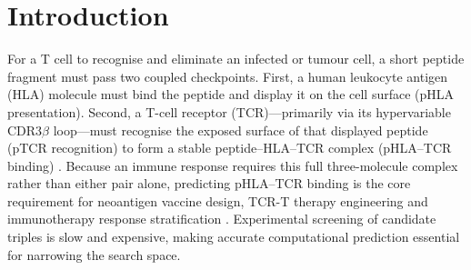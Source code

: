 \documentclass[webpdf,modern,large,namedate]{oup-authoring-template}
\theoremstyle{thmstyleone}
\theoremstyle{thmstyletwo}
\theoremstyle{thmstylethree}
\newcommand{\PH}{pHLA}
\newcommand{\PT}{pTCR}
\newcommand{\PHT}{pHLA--TCR}
\begin{document}
\section{Introduction}\label{sec:intro}

For a T cell to recognise and eliminate an infected or tumour cell, a short
peptide fragment must pass two coupled checkpoints. First, a human leukocyte
antigen (HLA) molecule must bind the peptide and display it on the cell surface
(\PH{} presentation). Second, a T-cell receptor (TCR)---primarily via its
hypervariable CDR3$\beta$ loop---must recognise the exposed surface of that
displayed peptide (\PT{} recognition) to form a stable peptide--HLA--TCR
complex (\PHT{} binding) \citep{rudolph2006structural}. Because an immune
response requires this full three-molecule complex rather than either pair
alone, predicting \PHT{} binding is the core requirement for neoantigen vaccine
design, TCR-T therapy engineering and immunotherapy response stratification
\citep{schumacher2015neoantigens, sahin2018personalized}. Experimental
screening of candidate triples is slow and expensive, making accurate
computational prediction essential for narrowing the search space.
\end{document}
